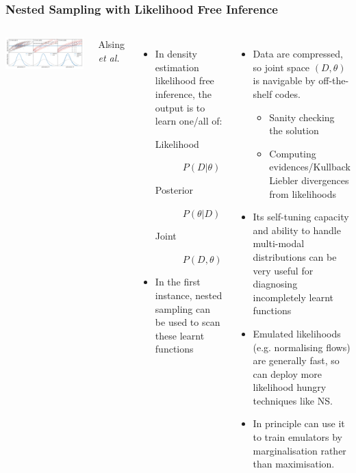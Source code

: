 \documentclass[aspectratio=169,handout]{beamer}
\begin{document}
\begin{frame}
    \frametitle{Nested Sampling with Likelihood Free Inference}
    \begin{columns}
        \includegraphics[width=\textwidth]{figures/three_ways_II.pdf}

        \hfill Alsing \textit{et al.}~
    \begin{itemize}
        \item In density estimation likelihood free inference, the output is to learn one/all of:
            \begin{description}
                \item[Likelihood] $P(D|\theta)$
                \item[Posterior] $P(\theta|D)$ 
                \item[Joint] $P(D,\theta)$
            \end{description}
        \item In the first instance, nested sampling can be used to scan these learnt functions
    \end{itemize}
    \begin{itemize}
        \item Data are compressed, so joint space $(D,\theta)$ is navigable by off-the-shelf codes. 
            \begin{itemize}
                \item Sanity checking the solution
                \item Computing evidences/Kullback Liebler divergences from likelihoods
            \end{itemize}
        \item Its self-tuning capacity and ability to handle multi-modal distributions can be very useful for diagnosing incompletely learnt functions
        \item Emulated likelihoods (e.g. normalising flows) are generally fast, so can deploy more likelihood hungry techniques like NS.
        \item In principle can use it to train emulators by marginalisation rather than maximisation.
    \end{itemize}
    \end{columns}
\end{frame}
\end{document}
